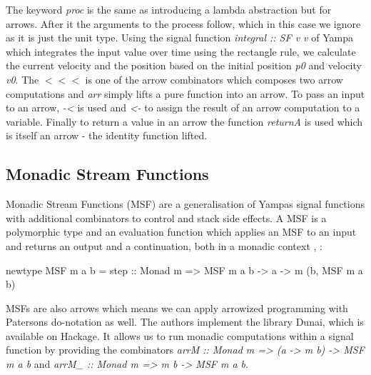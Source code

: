 The keyword \textit{proc} is the same as introducing a lambda abstraction but for arrows. After it the arguments to the process follow, which in this case we ignore as it is just the unit type. Using the signal function \textit{integral :: SF v v} of Yampa which integrates the input value over time using the rectangle rule, we calculate the current velocity and the position based on the initial position \textit{p0} and velocity \textit{v0}. The $<<<$ is one of the arrow combinators which composes two arrow computations and \textit{arr} simply lifts a pure function into an arrow. To pass an input to an arrow, \textit{-<} is used and \textit{<-} to assign the result of an arrow computation to a variable. Finally to return a value in an arrow the function \textit{returnA} is used which is itself an arrow - the identity function lifted.

\subsection{Monadic Stream Functions}
Monadic Stream Functions (MSF) are a generalisation of Yampas signal functions with additional combinators to control and stack side effects. A MSF is a polymorphic type and an evaluation function which applies an MSF to an input and returns an output and a continuation, both in a monadic context \cite{perez_functional_2016}, \cite{perez_extensible_2017}:
\begin{HaskellCode}
newtype MSF m a b = step :: Monad m => MSF m a b -> a -> m (b, MSF m a b)
\end{HaskellCode}

MSFs are also arrows which means we can apply arrowized programming with Patersons do-notation as well. The authors \cite{perez_functional_2016} implement the library Dunai, which is available on Hackage. It allows us to run monadic computations within a signal function by providing the combinators \textit{arrM :: Monad m => (a -> m b) -> MSF m a b} and \textit{arrM\_ :: Monad m => m b -> MSF m a b}.